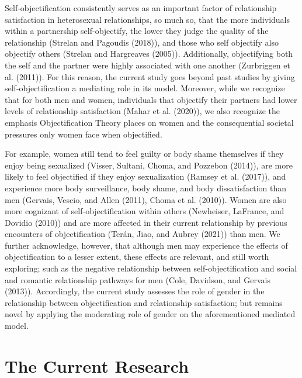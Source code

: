 \documentclass[
  english,
  man]{apa6}
\begin{document}
Self-objectification consistently serves as an important factor of relationship satisfaction in heterosexual relationships, so much so, that the more individuals within a partnership self-objectify, the lower they judge the quality of the relationship (Strelan and Pagoudis (2018)), and those who self objectify also objectify others (Strelan and Hargreaves (2005)). Additionally, objectifying both the self and the partner were highly associated with one another (Zurbriggen et al. (2011)). For this reason, the current study goes beyond past studies by giving self-objectification a mediating role in its model. Moreover, while we recognize that for both men and women, individuals that objectify their partners had lower levels of relationship satisfaction (Mahar et al. (2020)), we also recognize the emphasis Objectification Theory places on women and the consequential societal pressures only women face when objectified.

For example, women still tend to feel guilty or body shame themselves if they enjoy being sexualized (Visser, Sultani, Choma, and Pozzebon (2014)), are more likely to feel objectified if they enjoy sexualization (Ramsey et al. (2017)), and experience more body surveillance, body shame, and body dissatisfaction than men (Gervais, Vescio, and Allen (2011), Choma et al. (2010)). Women are also more cognizant of self-objectification within others (Newheiser, LaFrance, and Dovidio (2010)) and are more affected in their current relationship by previous encounters of objectification (Terán, Jiao, and Aubrey (2021)) than men. We further acknowledge, however, that although men may experience the effects of objectification to a lesser extent, these effects are relevant, and still worth exploring; such as the negative relationship between self-objectification and social and romantic relationship pathways for men (Cole, Davidson, and Gervais (2013)). Accordingly, the current study assesses the role of gender in the relationship between objectification and relationship satisfaction; but remains novel by applying the moderating role of gender on the aforementioned mediated model.

\hypertarget{the-current-research}{%
\section{The Current Research}\label{the-current-research}}
\end{document}
